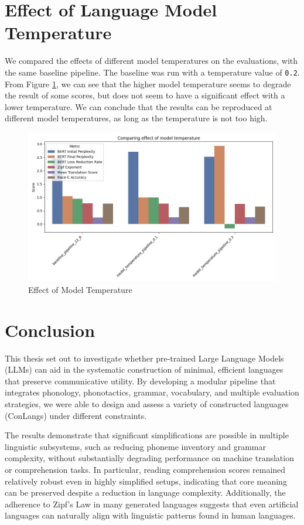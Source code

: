 \section{Effect of Language Model Temperature}
We compared the effects of different model temperatures on the evaluations, with the same baseline pipeline. The baseline was run with a temperature value of 
\texttt{0.2}. From Figure \ref{fig:compare-temperature}, we can see that the higher model temperature seems to degrade the result of some scores, but 
does not seem to have a significant effect with a lower temperature. We can conclude that the results can be reproduced at different model temperatures, as long as 
the temperature is not too high. 
\begin{figure}[H]  
    \centering
    \includegraphics[width=0.7\linewidth]{figures/results/1_effect_of_model_temperature.png}
    \caption{Effect of Model Temperature}
    \label{fig:compare-temperature}
\end{figure}


\section{Conclusion}
This thesis set out to investigate whether pre-trained Large Language Models (LLMs) can aid in the systematic construction of minimal, efficient 
languages that preserve communicative utility. By developing a modular pipeline that integrates phonology, phonotactics, grammar, vocabulary, and multiple evaluation strategies, 
we were able to design and assess a variety of constructed languages (ConLangs) under different constraints.

The results demonstrate that significant simplifications are possible in multiple linguistic subsystems, such as reducing phoneme inventory and grammar complexity,
without substantially degrading performance on machine translation or comprehension tasks. In particular, reading comprehension scores remained relatively robust even in highly 
simplified setups, indicating that core meaning can be preserved despite a reduction in language complexity. Additionally, the adherence to Zipf's Law in many generated languages 
suggests that even artificial languages can naturally align with linguistic patterns found in human languages.

